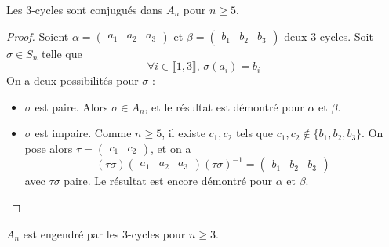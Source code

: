 





  \begin{lemma}
    \label{simplicite-du-groupe-alterne-1}
    Les $3$-cycles sont conjugués dans $A_n$ pour $n \geq 5$.
  \end{lemma}

  \begin{proof}
    Soient $\alpha = \begin{pmatrix} a_1 & a_2 & a_3 \end{pmatrix}$ et $\beta = \begin{pmatrix} b_1 & b_2 & b_3 \end{pmatrix}$ deux $3$-cycles. Soit $\sigma \in S_n$ telle que
    \[ \forall i \in \llbracket 1, 3 \rrbracket, \, \sigma(a_i) = b_i \]
    On a deux possibilités pour $\sigma$ :
    \begin{itemize}
      \item $\sigma$ est paire. Alors $\sigma \in A_n$, et le résultat est démontré pour $\alpha$ et $\beta$.
      \item $\sigma$ est impaire. Comme $n \geq 5$, il existe $c_1, c_2$ tels que $c_1, c_2 \notin \{ b_1, b_2, b_3 \}$. On pose alors $\tau = \begin{pmatrix} c_1 & c_2 \end{pmatrix}$, et on a
      \[ (\tau\sigma) \begin{pmatrix} a_1 & a_2 & a_3 \end{pmatrix} (\tau\sigma)^{-1} = \begin{pmatrix} b_1 & b_2 & b_3 \end{pmatrix} \]
      avec $\tau\sigma$ paire. Le résultat est encore démontré pour $\alpha$ et $\beta$.
    \end{itemize}
  \end{proof}


  \begin{lemma}
    \label{simplicite-du-groupe-alterne-2}
    $A_n$ est engendré par les $3$-cycles pour $n \geq 3$.
  \end{lemma}

